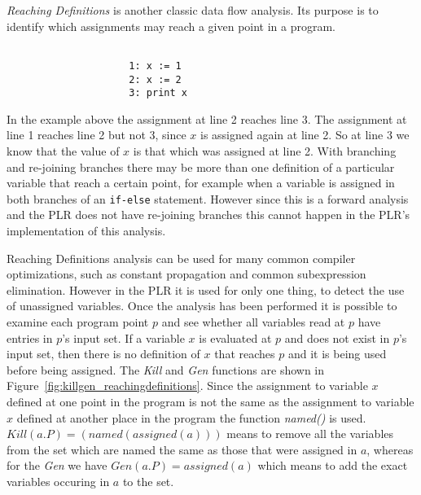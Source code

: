   \textit{Reaching Definitions} is another classic data flow analysis. Its 
  purpose is to identify which assignments may reach a given point in a 
  program.
  
\begin{Exa}
	\label{ex:reaching_definition}
	\begin{verbatim}
	
                     1: x := 1
                     2: x := 2
                     3: print x
	\end{verbatim}
\end{Exa}  
	
	In the example above the assignment at line 2 reaches line 3. The assignment 
	at line 1 reaches line 2 but not 3, since $x$ is assigned again at line 2. 
	So at line 3 we know that the value of $x$ is that which was assigned at 
	line 2. With branching and re-joining branches there may be more than one 
	definition of a particular variable that reach a certain point, for example 
	when a variable is assigned in both branches of an \texttt{if-else} 
	statement. However since this is a forward analysis and the PLR does not 
	have re-joining branches this cannot happen in the PLR's implementation of 
	this analysis. 
	
	Reaching Definitions analysis can be used for many common compiler 
	optimizations, such as constant propagation and common subexpression 
	elimination. However in the PLR it is used for only one thing, to detect the 
	use of unassigned variables. Once the analysis has been performed it is 
	possible to examine each program point $p$ and see whether all variables
	read at $p$ have entries in $p$'s input set. If a variable $x$ is evaluated
	at $p$ and does not exist in $p$'s input set, then there is no definition
	of $x$ that reaches $p$ and it is being used before being assigned. The 
	\textit{Kill} and \textit{Gen} functions are shown in 
	Figure~\ref{fig:killgen_reachingdefinitions}. Since the assignment to 
	variable $x$ defined at one point in the program is not the same as the 
	assignment to variable $x$ defined at another place in the program the 
	function \textit{named()} is used. ${Kill(a.P) = (named(assigned(a)))}$ 
	means to remove all the variables from the set which are named the same as 
	those that were assigned in $a$, whereas for the \textit{Gen} we have 
	$Gen(a.P) = assigned(a)$ which means to add the exact variables occuring in
	$a$ to the set. 
	
